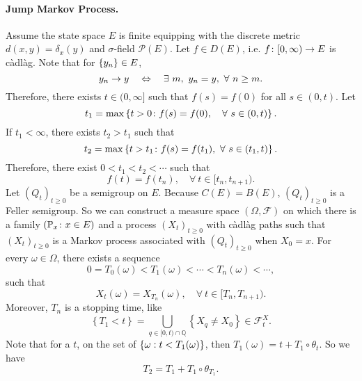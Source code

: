 \paragraph{Jump Markov Process.} Assume the state space $E$ is finite equipping with the discrete metric $d(x,y) = \delta_x(y)$ and $\sigma$-field $\mathcal{P}(E)$. Let $f \in D(E)$, i.e. $f \colon [0,\infty) \rightarrow E$ is c\`adl\`ag. Note that for $\left\{y_n\right\} \in E$,
\begin{equation*}
    y_n \rightarrow y \quad \Leftrightarrow \quad \exists~m,~ y_n = y,~\forall~ n \geq m. 
\end{equation*}
Therefore, there exists $t \in (0,\infty]$ such that $f(s) = f(0)$ for all $s \in (0,t)$. Let
\begin{equation*}
    t_1 = \max \left\{t > 0 \colon f(s) = f(0),\quad \forall~s \in (0,t)\right\}.
\end{equation*}
If $t_1 < \infty$, there exists $t_2 > t_1$ such that
\begin{equation*}
    t_2 = \max \left\{t > t_1 \colon f(s) = f(t_1),~\forall~s \in (t_1,t)\right\}.
\end{equation*}
Therefore, there exist $0 < t_1 < t_2 < \cdots$ such that
\begin{equation*}
    f(t) = f(t_n),\quad \forall~ t \in [t_n,t_{n+1}).
\end{equation*}
Let $(Q_t)_{t \geq 0}$ be a semigroup on $E$. Because $C(E) = B(E)$, $(Q_t)_{t \geq 0}$ is a Feller semigroup. So we can construct a measure space $(\Omega ,\mathcal{F})$ on which there is a family $(\mathbb{P}_x\colon x\in E)$ and a process $(X_t)_{t \geq 0}$ with c\`adl\`ag paths such that $(X_t)_{t \geq 0}$ is a Markov process associated with $(Q_t)_{t \geq 0}$ when $X_0 = x$. For every $\omega \in \Omega$, there exists a sequence
\begin{equation*}
    0 = T_0(\omega) < T_1(\omega) < \cdots < T_n(\omega) < \cdots,
\end{equation*}
such that
\begin{equation*}
    X_t(\omega) = X_{T_n}(\omega),\quad \forall~ t \in [T_n,T_{n+1}).
\end{equation*}
Moreover, $T_n$ is a stopping time, like
\begin{equation*}
    \left\{T_1<t\right\}=\bigcup_{q \in[0, t) \cap \mathbb{Q}}\left\{X_q \neq X_0\right\} \in \mathcal{F}^X_t.
\end{equation*}
Note that for a $t$, on the set of $\left\{\omega: t < T_1(\omega)\right\}$, then $T_1(\omega) = t + T_1 \circ \theta_t$. So we have
\begin{equation*}
    T_2 = T_1 + T_1 \circ \theta_{T_1}.
\end{equation*}

